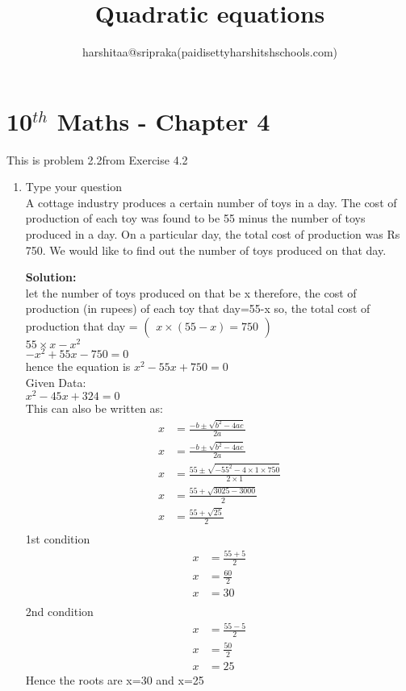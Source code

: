 \documentclass[12pt]{article}
\title{Quadratic equations}
\author{harshitaa@sripraka(paidisettyharshitshschools.com)}
\newcommand{\myvec}[1]{\ensuremath{\begin{pmatrix}#1\end{pmatrix}}}
\newcommand{\solution}{\noindent \textbf{Solution: }}
\begin{document}
\maketitle
\section*{10$^{th}$ Maths - Chapter 4}
This is problem 2.2from Exercise 4.2
\begin{enumerate}
\item Type your question \\
 A cottage industry produces a certain number of toys in a day. The cost of production of each  toy was found to be 55 minus the number of toys produced in a day. On a particular day, the total cost of production was Rs 750. We would like to find out the number of toys produced on that day.
 
\solution\\
let the number of toys produced on that be x
therefore, the cost of production (in rupees) of each toy that day=55-x
so, the total cost of production that day =
\myvec{{x\times(55-x)}=750}\\
${55\times x-x^2}$\\
${-x^2+55x-750=0}$\\
 hence the equation is
 ${x^2-55x+750=0}$\\
 Given Data:\\
${x^2-45x+324=0}$ \\
This can also be written as:
\begin{align}
x &=\frac{-b\pm\sqrt{b^2-4ac}}{2a}\\
x &=\frac{-b\pm\sqrt{b^2-4ac}}{2a}\\
x &=\frac{55\pm\sqrt{-55^2-4 \times 1\times750}}{2 \times 1}\\
x &=\frac{55+\sqrt{3025-3000}}{2}\\
x &=\frac{55+\sqrt{25}}{2}\\
\end{align}
1st condition\\
\begin{align}
x &=\frac{55+5}{2}\\
x &=\frac{60}{2}\\
x &=30\\
\end{align}
2nd condition\\
\begin{align}
x &=\frac{55-5}{2}\\
x &=\frac{50}{2}\\
x &=25
\end{align}
Hence the roots are x=30 and x=25
\end{enumerate}
\end{document}
